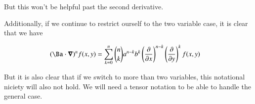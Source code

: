 \documentclass{article}
\begin{document}
But this won't be helpful past the second derivative.

Additionally, if we continue to restrict ourself to the two variable case, 
it is clear that we have

\begin{align*}
(\Ba \cdot \spacegrad)^n f(x,y) 
&=
\sum_{k=0}^{n} \binom{n}{k} a^{n-k} b^{k} 
\left( \PD{x}{} \right)^{n-k}
\left( \PD{y}{} \right)^{k} f(x,y)
\end{align*}

But it is also clear that if we switch to more than two variables, this notational niciety will also not hold.
We will need a tensor notation to be able to handle the general case.



\end{document}

